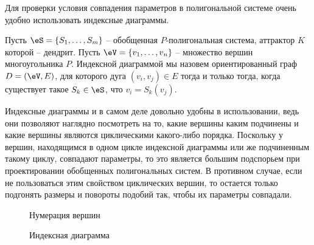 Для проверки условия совпадения параметров в полигональной системе очень удобно использовать индексные диаграммы.

\begin{definition}\label{diagram}
Пусть $\eS=\{S_1,\ldots,S_m\}$ -- обобщенная $P$-полигональная система, аттрактор $K$ которой -- дендрит. Пусть $\eV=\{v_1,\ldots,v_n\}$ -- множество вершин многоугольника $P$. Индексной диаграммой мы назовем ориентированный граф $D=(\eV,E)$, для которого дуга $(v_i,v_j)\in E$ тогда и только тогда, когда существует такое $S_k\in\eS$, что $v_i=S_k(v_j)$. 
\end{definition}

Индексные диаграммы и в самом деле довольно удобны в использовании, ведь они позволяют наглядно посмотреть на то, какие вершины каким подчинены и какие вершины являются циклическими какого-либо порядка. Поскольку у вершин, находящимся в одном цикле индексной диаграммы или же подчиненным такому циклу, совпадают параметры, то это является большим подспорьем при проектировании обобщенных полигональных систем. В противном случае, если не пользоваться этим свойством циклических вершин, то остается только подгонять размеры и повороты подобий так, чтобы их параметры совпадали.

\begin{figure}[h!]
\begin{center}
\begin{minipage}[h]{0.45\linewidth}
\caption{Нумерация вершин}%
\label{logimg0}%
\end{minipage}
\hfill
\begin{minipage}[h]{0.45\linewidth}
\vspace{2.5cm}
\hspace{1cm}
\caption{Индексная диаграмма}%
\label{logimg1}%
\end{minipage}
\end{center}
\end{figure}

